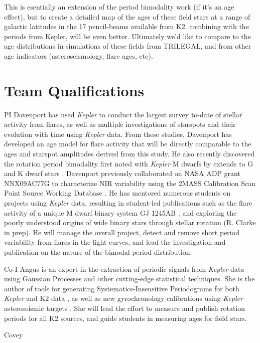 \documentclass[12pt]{article}
\newcommand{\Kepler}{\textsl{Kepler}\xspace}
\begin{document}
This is esentially an extension of the period bimodality work (if it's an age
effect), but to create a detailed map of the ages of these field stars at a
range of galactic latitudes in the 17 pencil-beams available from K2.
combining with the periods from Kepler, will be even better.
Ultimately we'd like to compare to the age distributions in simulations of
these fields from TRILEGAL, and from other age indicators (asteroseismology,
flare ages, etc).

\section{Team Qualifications}
PI Davenport has used \Kepler to conduct the largest survey to-date of stellar activity from flares, as well as multiple investigations of starspots and their evolution with time using \Kepler data. From these studies, Davenport has developed an age model for flare activity that will be directly comparable to the ages and starspot amplitudes derived from this study. He also recently discovered the rotation period bimodality first noted with \Kepler M dwarfs by \citet{mcquillan2013} extends to G and K dwarf stars \citep{davenport2017}.
Davenport previously collaborated on NASA ADP grant NNX09AC77G to characterize NIR variability using the 2MASS Calibration Scan Point Source Working Database \citep{davenport2012,davenport2015a}.
He has mentored numerous students on projects using \Kepler data, resulting in student-led publications such as the flare activity of a unique M dwarf binary system GJ 1245AB \citep{lurie2015}, and exploring the poorly understood origins of wide binary stars through stellar rotation (R. Clarke in prep). He will manage the overall project, detect and remove short period variability from flares in the light curves, and lead the investigation and publication on the nature of the bimodal period distribution.

Co-I Angus is an expert in the extraction of periodic signals from \Kepler data using Gaussian Processes \citep{angus2016c} and other cutting-edge statistical techniques. She is the author of tools for generating Systematics-Insensitive Periodograms for both \Kepler and K2 data \citep{angus2016}, as well as new gyrochronology calibrations using \Kepler asteroseismic targets \citep{angus2015}. She will lead the effort to measure and publish rotation periods for all K2 sources, and guide students in measuring ages for field stars.

Covey
\end{document}
